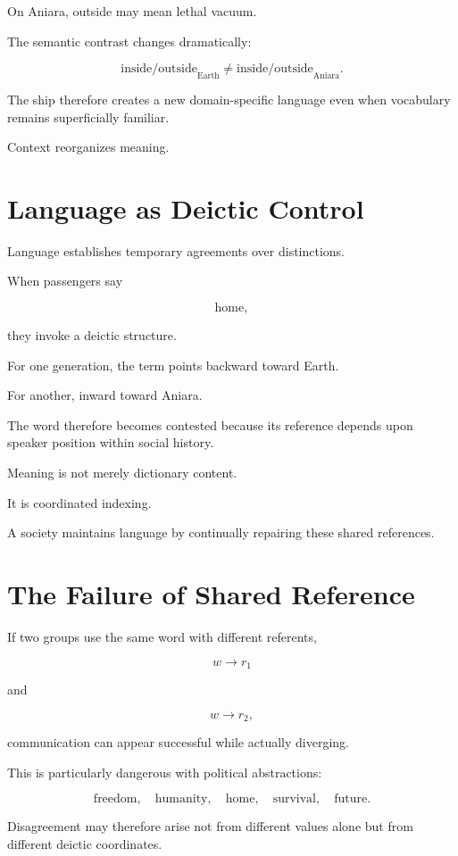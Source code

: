 \documentclass[11pt,oneside]{book}
\theoremstyle{definition}
\theoremstyle{remark}
\begin{document}
On Aniara, outside may mean lethal vacuum.

The semantic contrast changes dramatically:

\[
\text{inside/outside}_{\mathrm{Earth}}
\neq
\text{inside/outside}_{\mathrm{Aniara}}.
\]

The ship therefore creates a new domain-specific language even when vocabulary remains superficially familiar.

Context reorganizes meaning.

\section{Language as Deictic Control}

Language establishes temporary agreements over distinctions.

When passengers say

\[
\text{home},
\]

they invoke a deictic structure.

For one generation, the term points backward toward Earth.

For another, inward toward Aniara.

The word therefore becomes contested because its reference depends upon speaker position within social history.

Meaning is not merely dictionary content.

It is coordinated indexing.

A society maintains language by continually repairing these shared references.

\section{The Failure of Shared Reference}

If two groups use the same word with different referents,

\[
w\rightarrow r_1
\]

and

\[
w\rightarrow r_2,
\]

communication can appear successful while actually diverging.

This is particularly dangerous with political abstractions:

\[
\text{freedom},
\quad
\text{humanity},
\quad
\text{home},
\quad
\text{survival},
\quad
\text{future}.
\]

Disagreement may therefore arise not from different values alone but from different deictic coordinates.
\end{document}
